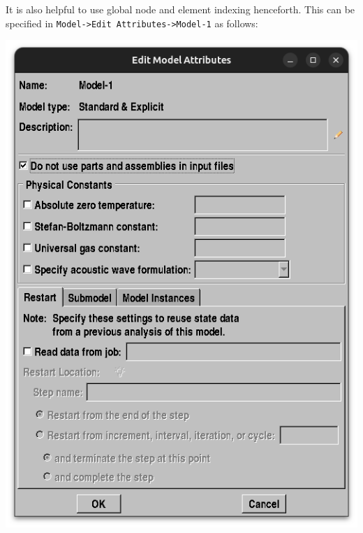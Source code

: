 \documentclass[11pt]{article}
\begin{document}
It is also helpful to use global node and element indexing henceforth.
This can be specified in \texttt{Model->Edit Attributes->Model-1} as follows:
\begin{center}
\includegraphics[width=.9\linewidth]{./figs/modl.png}
\end{center}
\end{document}
